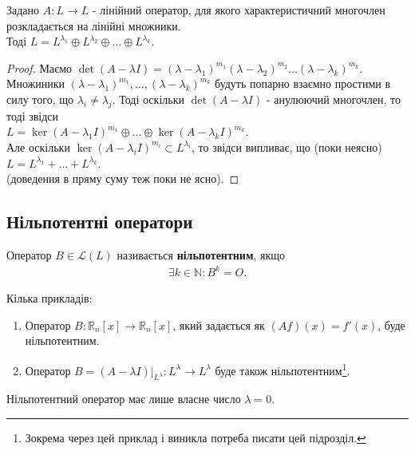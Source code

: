 \documentclass{math_library}
\begin{document}
\begin{theorem}
Задано $A: L \to L$ - лінійний оператор, для якого характеристичний многочлен розкладається на лінійні множники.\\
Тоді $L = L^{\lambda_1}  \oplus  L^{\lambda_2}  \oplus  \dots  \oplus  L^{\lambda_k}$.
\end{theorem}

\begin{proof}
Маємо $\det(A-\lambda I) = (\lambda-\lambda_1)^{m_1} (\lambda-\lambda_2)^{m_2} \dots (\lambda-\lambda_k)^{m_k}$. Множиники $(\lambda-\lambda_1)^{m_1},\dots,(\lambda-\lambda_k)^{m_k}$ будуть попарно взаємно простими в силу того, що $\lambda_i \neq \lambda_j$. Тоді оскільки $\det (A-\lambda I)$ - анулюючий многочлен, то тоді звідси\\
$L = \ker(A-\lambda_1 I)^{m_1}  \oplus  \dots  \oplus  \ker(A-\lambda_k I)^{m_k}$.\\
Але оскільки $\ker (A-\lambda_i I)^{m_i} \subset L^{\lambda_i}$, то звідси випливає, що (поки неясно)\\
$L = L^{\lambda_1} + \dots + L^{\lambda_k}$.\\
(доведення в пряму суму теж поки не ясно).
\end{proof}
\fi

\subsection{Нільпотентні оператори}
\begin{definition}
Оператор $B \in \mathcal{L}(L)$ називається \textbf{нільпотентним}, якщо
\begin{align*}
\exists k \in \mathbb{N}: B^k = O.
\end{align*}
\end{definition}

\begin{example}
Кілька прикладів:
\begin{enumerate}[nosep,wide=0pt,label={\arabic*)}]
\item Оператор $B \colon \mathbb{R}_n[x] \to \mathbb{R}_n[x]$, який задається як $(Af)(x) = f'(x)$, буде нільпотентним.
\item Оператор $B = (A-\lambda I)|_{L^\lambda} \colon L^{\lambda} \to L^{\lambda}$ буде також нільпотентним\footnote{Зокрема через цей приклад і виникла потреба писати цей підрозділ.}.
\end{enumerate}
\end{example}

\begin{proposition}
Нільпотентний оператор має лише власне число $\lambda = 0$.
\end{proposition}
\end{document}
